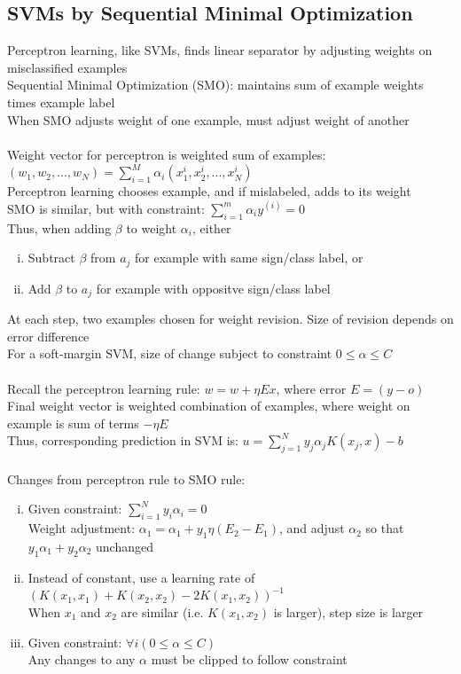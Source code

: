 \documentclass{article}
\begin{document}
		\subsection{SVMs by Sequential Minimal Optimization}
			Perceptron learning, like SVMs, finds linear separator by adjusting weights on misclassified examples \\
			Sequential Minimal Optimization (SMO): maintains sum of example weights times example label \\
			When SMO adjusts weight of one example, must adjust weight of another \\
			\\
			Weight vector for perceptron is weighted sum of examples: \\
			$(w_1, w_2, ..., w_N) = \sum_{i = 1}^M\alpha_i(x_1^i, x_2^i, ..., x_N^i)$ \\
			Perceptron learning chooses example, and if mislabeled, adds to its weight \\
			SMO is similar, but with constraint: $\sum_{i = 1}^m \alpha_i y^{(i)} = 0$ \\
			Thus, when adding $\beta$ to weight $\alpha_i$, either
			\begin{enumerate}[(i)]
				\item Subtract $\beta$ from $a_j$ for example with same sign/class label, or
				\item Add $\beta$ to $a_j$ for example with oppositve sign/class label
				\end{enumerate}
			At each step, two examples chosen for weight revision. Size of revision depends on error difference \\
			For a soft-margin SVM, size of change subject to constraint $0 \leq \alpha \leq C$ \\
			\\
			Recall the perceptron learning rule: $w = w + \eta E x$, where error $E = (y - o)$ \\
			Final weight vector is weighted combination of examples, where weight on example is sum of terms $-\eta E$ \\
			Thus, corresponding prediction in SVM is: $u = \sum_{j = 1}^N y_j\alpha_j K(x_j, x) - b$ \\
			\\
			Changes from perceptron rule to SMO rule:
			\begin{enumerate}[(i)]
				\item Given constraint: $\sum_{i = 1}^N y_i\alpha_i = 0$ \\
				Weight adjustment: $\alpha_1 = \alpha_1 + y_1\eta(E_2 - E_1)$, and adjust $\alpha_2$ so that $y_1\alpha_1 + y_2\alpha_2$ unchanged
				\item Instead of constant, use a learning rate of $(K(x_1, x_1) + K(x_2, x_2) - 2K(x_1, x_2))^{-1}$ \\
				When $x_1$ and $x_2$ are similar (i.e. $K(x_1, x_2)$ is larger), step size is larger
				\item Given constraint: $\forall{i}(0 \leq \alpha \leq C)$ \\
				Any changes to any $\alpha$ must be clipped to follow constraint
				\end{enumerate}
\end{document}
